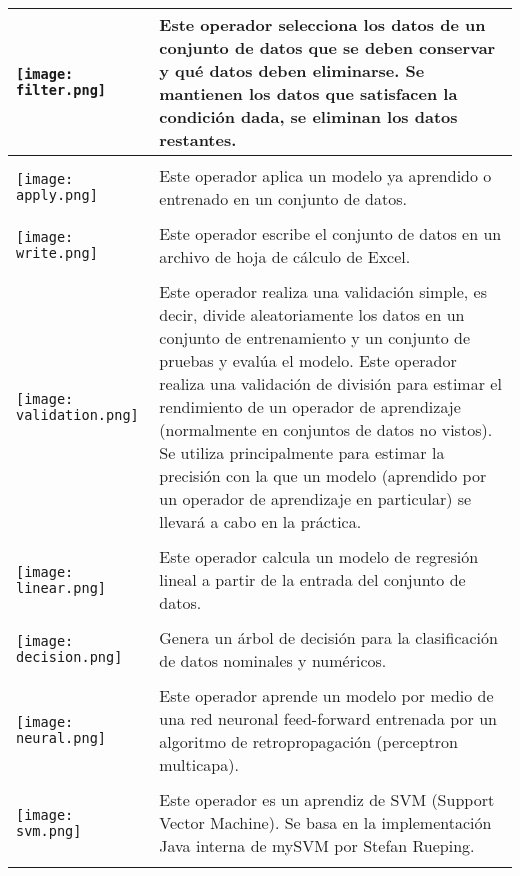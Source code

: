 \begin{longtable}{>{\centering\arraybackslash}m{3cm} >{\centering\arraybackslash}m{8cm}}
	     \texttt{[image: filter.png]} & Este operador selecciona los datos de un conjunto de datos que se deben conservar y qué datos deben eliminarse. Se mantienen los datos que satisfacen la condición dada, se eliminan los datos restantes. \\	\hline \\
		
		 \texttt{[image: apply.png]} & Este operador aplica un modelo ya aprendido o entrenado en un conjunto de datos. \\	\hline \\
		 
		 \texttt{[image: write.png]} &  Este operador escribe el conjunto de datos en un archivo de hoja de cálculo de Excel.\\	\hline \\
		
		 \texttt{[image: validation.png]} & Este operador realiza una validación simple, es decir, divide aleatoriamente los datos en un conjunto de entrenamiento y un conjunto de pruebas y evalúa el modelo. Este operador realiza una validación de división para estimar el rendimiento de un operador de aprendizaje (normalmente en conjuntos de datos no vistos). Se utiliza principalmente para estimar la precisión con la que un modelo (aprendido por un operador de aprendizaje en particular) se llevará a cabo en la práctica. \\	\hline \\
		 
		 \texttt{[image: linear.png]} & Este operador calcula un modelo de regresión lineal a partir de la entrada del conjunto de datos. \\	\hline \\
		 
		 \texttt{[image: decision.png]} & Genera un árbol de decisión para la clasificación de datos nominales y numéricos. \\	\hline \\
		 
		 \texttt{[image: neural.png]} & Este operador aprende un modelo por medio de una red neuronal feed-forward entrenada por un algoritmo de retropropagación (perceptron multicapa).  \\	\hline \\
		 
		 \texttt{[image: svm.png]} & Este operador es un aprendiz de SVM (Support Vector Machine). Se basa en la implementación Java interna de mySVM por Stefan Rueping. \\	\hline \\
		 

\end{longtable}
